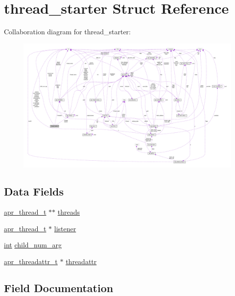 \hypertarget{structthread__starter}{}\section{thread\+\_\+starter Struct Reference}
\label{structthread__starter}


Collaboration diagram for thread\+\_\+starter\+:
\nopagebreak
\begin{figure}[H]
\begin{center}
\leavevmode
\includegraphics[width=350pt]{structthread__starter__coll__graph}
\end{center}
\end{figure}
\subsection*{Data Fields}
\begin{DoxyCompactItemize}
\item 
\hyperlink{structapr__thread__t}{apr\+\_\+thread\+\_\+t} $\ast$$\ast$ \hyperlink{structthread__starter_a7a51fbe5bdaf8b26340e795f2ce94299}{threads}
\item 
\hyperlink{structapr__thread__t}{apr\+\_\+thread\+\_\+t} $\ast$ \hyperlink{structthread__starter_acacd48c396b6aa583c205f9ee2b60a01}{listener}
\item 
\hyperlink{pcre_8txt_a42dfa4ff673c82d8efe7144098fbc198}{int} \hyperlink{structthread__starter_a99c153b06b26e637a09baf75bc4df72c}{child\+\_\+num\+\_\+arg}
\item 
\hyperlink{structapr__threadattr__t}{apr\+\_\+threadattr\+\_\+t} $\ast$ \hyperlink{structthread__starter_a6aa5615e34d5142e6939afa0121233eb}{threadattr}
\end{DoxyCompactItemize}


\subsection{Field Documentation}
